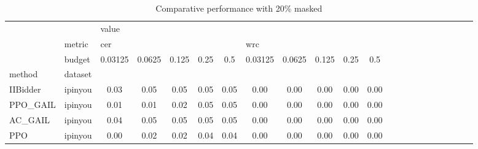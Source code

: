 \begin{table}[htbp]
\centering
\caption{Comparative performance with 20\% masked}
\label{mask_0.20}
\begin{tabular}{l|l|cc|cc|cc|cc|cc|cc|cc|cc|cc|cc}
\toprule
    & {} & \multicolumn{10}{l}{value} \\
    & metric & \multicolumn{5}{l}{cer} & \multicolumn{5}{l}{wrc} \\
    & budget & 0.03125 & 0.0625 & 0.125 & 0.25 &  0.5 & 0.03125 & 0.0625 & 0.125 & 0.25 &  0.5 \\
method & dataset &         &        &       &      &      &         &        &       &      &      \\
\midrule
IIBidder & ipinyou &    0.03 &   0.05 &  0.05 & 0.05 & 0.05 &    0.00 &   0.00 &  0.00 & 0.00 & 0.00 \\
PPO\_GAIL & ipinyou &    0.01 &   0.01 &  0.02 & 0.05 & 0.05 &    0.00 &   0.00 &  0.00 & 0.00 & 0.00 \\
AC\_GAIL & ipinyou &    0.04 &   0.05 &  0.05 & 0.05 & 0.05 &    0.00 &   0.00 &  0.00 & 0.00 & 0.00 \\
PPO & ipinyou &    0.00 &   0.02 &  0.02 & 0.04 & 0.04 &    0.00 &   0.00 &  0.00 & 0.00 & 0.00 \\
\bottomrule
\end{tabular}
\end{table}

